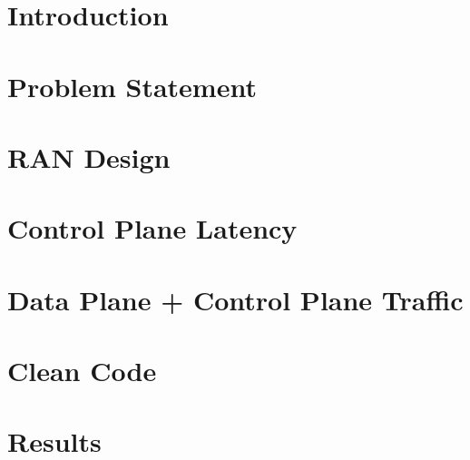 \documentclass[a4paper,12pt]{report}
\renewcommand{\headrulewidth}{0pt}
\begin{document}
\fancyfoot[CO]{\thepage}

\newpage
\setcounter{page}{3}
% 
% 	
% 
\tableofcontents
\listoffigures
\newpage
{}
\fancyhead[RO]{\thepage}
\fancyhead[LO]{\slshape \leftmark}
\fancyfoot[CO]{}
\renewcommand{\headrulewidth}{0.5pt}

\chapter{Introduction \label{chap:Introduction}}


\chapter{Problem Statement \label{chap:ProblemStatement}}


\chapter{RAN Design\label{chap:RANDesign}}


\chapter{Control Plane Latency\label{chap:CPLatency}}


\chapter{Data Plane + Control Plane Traffic\label{chap:CPDPTraffic}}


\chapter{Clean Code\label{chap:CleanCode}}



\chapter{Results\label{chap:Results}}




\begin{spacing}{1}


\end{spacing}
\end{document}
